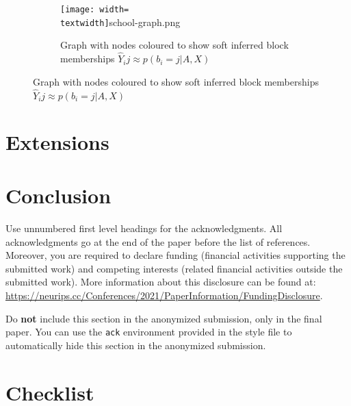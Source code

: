 \documentclass{article}
\begin{document}
\begin{figure}[!h]
	\centering
	\begin{subfigure}{0.4\textwidth}
		\centering
		\texttt{[image: width=\\textwidth]}{school-graph.png}
		\caption{Graph with nodes coloured to show soft inferred block memberships $\hat{Y}_ij \approx p(b_i=j|A, X)$}
	\end{subfigure}
\end{figure}

\section{Extensions}

\section{Conclusion}

\begin{ack}
Use unnumbered first level headings for the acknowledgments. All acknowledgments
go at the end of the paper before the list of references. Moreover, you are required to declare
funding (financial activities supporting the submitted work) and competing interests (related financial activities outside the submitted work).
More information about this disclosure can be found at: \url{https://neurips.cc/Conferences/2021/PaperInformation/FundingDisclosure}.

Do {\bf not} include this section in the anonymized submission, only in the final paper. You can use the \texttt{ack} environment provided in the style file to automatically hide this section in the anonymized submission.
\end{ack}



\section*{Checklist}
\end{document}
